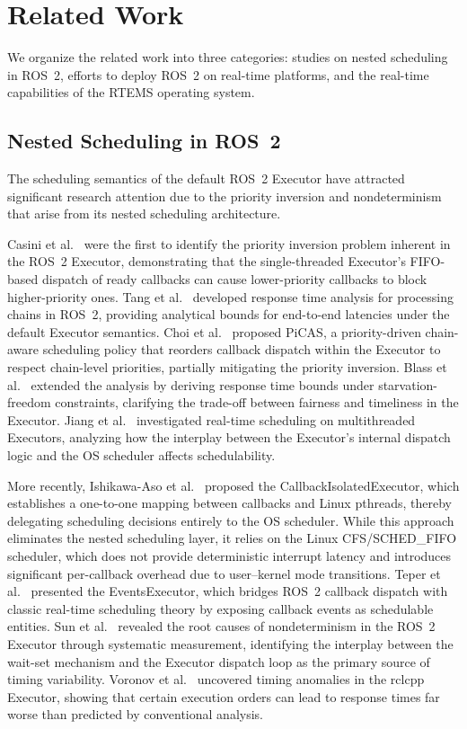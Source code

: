 \section{Related Work}
\label{sec:related}

We organize the related work into three categories: studies on nested scheduling in ROS~2, efforts to deploy ROS~2 on real-time platforms, and the real-time capabilities of the RTEMS operating system.

\subsection{Nested Scheduling in ROS~2}

The scheduling semantics of the default ROS~2 Executor have attracted significant research attention due to the priority inversion and nondeterminism that arise from its nested scheduling architecture.

Casini et al.~\cite{casini2019} were the first to identify the priority inversion problem inherent in the ROS~2 Executor, demonstrating that the single-threaded Executor's FIFO-based dispatch of ready callbacks can cause lower-priority callbacks to block higher-priority ones. Tang et al.~\cite{tang2020} developed response time analysis for processing chains in ROS~2, providing analytical bounds for end-to-end latencies under the default Executor semantics. Choi et al.~\cite{choi2021} proposed PiCAS, a priority-driven chain-aware scheduling policy that reorders callback dispatch within the Executor to respect chain-level priorities, partially mitigating the priority inversion. Blass et al.~\cite{blass2021} extended the analysis by deriving response time bounds under starvation-freedom constraints, clarifying the trade-off between fairness and timeliness in the Executor. Jiang et al.~\cite{jiang2022} investigated real-time scheduling on multithreaded Executors, analyzing how the interplay between the Executor's internal dispatch logic and the OS scheduler affects schedulability.

More recently, Ishikawa-Aso et al.~\cite{ishikawa2025} proposed the CallbackIsolatedExecutor, which establishes a one-to-one mapping between callbacks and Linux pthreads, thereby delegating scheduling decisions entirely to the OS scheduler. While this approach eliminates the nested scheduling layer, it relies on the Linux CFS/SCHED\_FIFO scheduler, which does not provide deterministic interrupt latency and introduces significant per-callback overhead due to user--kernel mode transitions. Teper et al.~\cite{teper2024} presented the EventsExecutor, which bridges ROS~2 callback dispatch with classic real-time scheduling theory by exposing callback events as schedulable entities. Sun et al.~\cite{sun2024} revealed the root causes of nondeterminism in the ROS~2 Executor through systematic measurement, identifying the interplay between the wait-set mechanism and the Executor dispatch loop as the primary source of timing variability. Voronov et al.~\cite{voronov2024} uncovered timing anomalies in the rclcpp Executor, showing that certain execution orders can lead to response times far worse than predicted by conventional analysis.

